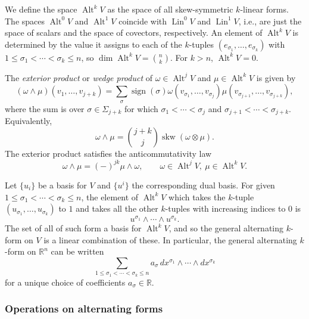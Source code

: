 {We define the space $\operatorname{Alt}^kV$ as the space of all skew-symmetric $k$-linear forms. The spaces $\operatorname{Alt}^0V$ and $\operatorname{Alt}^1V$ coincide with $\operatorname{Lin}^0V$ and $\operatorname{Lin}^1V$, i.e., are just the space of scalars and the space of covectors, respectively. An element of $\operatorname{Alt}^kV$ is determined by the value it assigns to each of the $k$-tuples $(e_{\sigma_1},\ldots,e_{\sigma_k})$ with $1\leq\sigma_1<\cdots<\sigma_k\leq n$, so $\dim\operatorname{Alt}^kV=\binom nk$. For $k>n$, $\operatorname{Alt}^kV=0$.}

{The \emph{exterior product} or \emph{wedge product} of $\omega\in\operatorname{Alt}^jV$ and $\mu\in\operatorname{Alt}^kV$ is given by}
\[
(\omega\wedge\mu)(v_1,\ldots,v_{j+k})=\sum_\sigma\operatorname{sign}(\sigma)\omega(v_{\sigma_1},\ldots,v_{\sigma_j})\mu(v_{\sigma_{j+1}},\ldots,v_{\sigma_{j+k}}),
\]
{where the sum is over $\sigma\in\Sigma_{j+k}$ for which $\sigma_1<\cdots<\sigma_j$ and $\sigma_{j+1}<\cdots<\sigma_{j+k}$. Equivalently,}
\[
\omega\wedge\mu=\binom{j+k}j\operatorname{skw}(\omega\otimes\mu).
\]
{The exterior product satisfies the anticommutativity law}
\[
\omega\wedge\mu=(-)^{jk}\mu\wedge\omega,\qquad\omega\in\operatorname{Alt}^jV,\ \mu\in\operatorname{Alt}^kV.
\]

{Let $\{u_i\}$ be a basis for $V$ and $\{u^i\}$ the corresponding dual basis. For given $1\leq\sigma_1<\cdots<\sigma_k\leq n$, the element of $\operatorname{Alt}^kV$ which takes the $k$-tuple $(u_{\sigma_1},\ldots,u_{\sigma_k})$ to $1$ and takes all the other $k$-tuples with increasing indices to $0$ is}
\begin{equation}\label{eq:alternating-form-basis}
u^{\sigma_1}\wedge\cdots\wedge u^{\sigma_k}.
\end{equation}
{The set of all of such form a basis for $\operatorname{Alt}^kV$, and so the general alternating $k$-form on $V$ is a linear combination of these. In particular, the general alternating $k$-form on $\mathbb R^n$ can be written}
\[
\sum_{1\leq\sigma_1<\cdots<\sigma_k\leq n}a_\sigma\,dx^{\sigma_1}\wedge\cdots\wedge dx^{\sigma_k}
\]
{for a unique choice of coefficients $a_\sigma\in\mathbb R$.}

\subsubsection{{Operations on alternating forms}}\label{subsec:alternating-form-operations}

